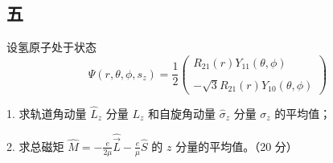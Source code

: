 \subsection{五}
设氢原子处于状态
\begin{equation}
\Psi (r, \theta, \phi, s_z) = \frac{1}{2}
 \begin{pmatrix}
R_{21}(r)Y_{11}(\theta, \phi) \\\\
-\sqrt{3}R_{21}(r)Y_{10}(\theta, \phi)
\end{pmatrix}~
\end{equation}

1. 求轨道角动量 $\hat{L}_z$ 分量 $L_z$ 和自旋角动量 $\hat{\sigma}_z$ 分量 $\sigma_z$ 的平均值；

2. 求总磁矩 $\hat{M} = -\frac{e}{2\mu} \hat{\vec L} - \frac{e}{\mu} \hat{S}$ 的 $z$ 分量的平均值。（20 分）
